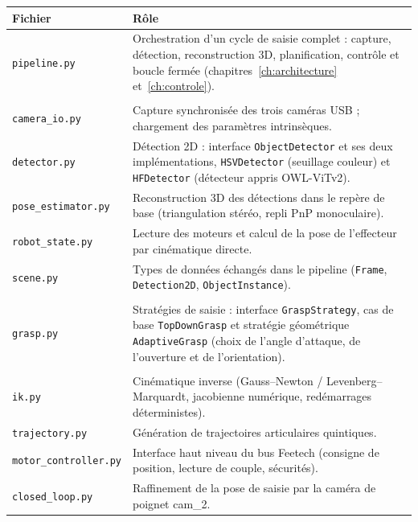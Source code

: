 \begin{table}[ht]
  \centering\small
  \begin{tabularx}{\linewidth}{l X}
    \toprule
    Fichier & Rôle \\
    \midrule
    \texttt{pipeline.py} & Orchestration d'un cycle de saisie complet : capture, détection, reconstruction 3D, planification, contrôle et boucle fermée (chapitres~\ref{ch:architecture} et~\ref{ch:controle}). \\
    \addlinespace
    \multicolumn{2}{@{}l}{\emph{\texttt{perception/} --- chapitre~\ref{ch:perception}}} \\
    \texttt{camera\_io.py} & Capture synchronisée des trois caméras USB ; chargement des paramètres intrinsèques. \\
    \texttt{detector.py} & Détection 2D : interface \texttt{ObjectDetector} et ses deux implémentations, \texttt{HSVDetector} (seuillage couleur) et \texttt{HFDetector} (détecteur appris OWL-ViTv2). \\
    \texttt{pose\_estimator.py} & Reconstruction 3D des détections dans le repère de base (triangulation stéréo, repli PnP monoculaire). \\
    \texttt{robot\_state.py} & Lecture des moteurs et calcul de la pose de l'effecteur par cinématique directe. \\
    \texttt{scene.py} & Types de données échangés dans le pipeline (\texttt{Frame}, \texttt{Detection2D}, \texttt{ObjectInstance}). \\
    \addlinespace
    \multicolumn{2}{@{}l}{\emph{\texttt{planning/} --- chapitre~\ref{ch:planification}}} \\
    \texttt{grasp.py} & Stratégies de saisie : interface \texttt{GraspStrategy}, cas de base \texttt{TopDownGrasp} et stratégie géométrique \texttt{AdaptiveGrasp} (choix de l'angle d'attaque, de l'ouverture et de l'orientation). \\
    \addlinespace
    \multicolumn{2}{@{}l}{\emph{\texttt{control/} --- chapitre~\ref{ch:controle}}} \\
    \texttt{ik.py} & Cinématique inverse (Gauss--Newton / Levenberg--Marquardt, jacobienne numérique, redémarrages déterministes). \\
    \texttt{trajectory.py} & Génération de trajectoires articulaires quintiques. \\
    \texttt{motor\_controller.py} & Interface haut niveau du bus Feetech (consigne de position, lecture de couple, sécurités). \\
    \texttt{closed\_loop.py} & Raffinement de la pose de saisie par la caméra de poignet cam\_2. \\

\end{tabularx}
\end{table}
